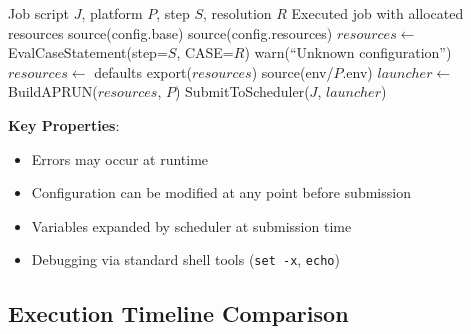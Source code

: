 \documentclass[11pt,twoside]{article}
\newcommand{\gw}{\textsc{Global-Workflow}}
\begin{document}
\begin{algorithm}[H]
\caption{\gw{} Configuration Resolution}
\label{alg:gw-exec}
\begin{algorithmic}[1]
\REQUIRE Job script $J$, platform $P$, step $S$, resolution $R$
\ENSURE Executed job with allocated resources
\STATE source(config.base) 
\STATE source(config.resources) 
\STATE $resources \gets$ EvalCaseStatement(step=$S$, CASE=$R$) 
    \STATE warn(``Unknown configuration'')
    \STATE $resources \gets$ defaults
\ENDIF {}
\STATE export($resources$) 
\STATE source(env/$P$.env) 
\STATE $launcher \gets$ BuildAPRUN($resources$, $P$)
\STATE SubmitToScheduler($J$, $launcher$) 
\end{algorithmic}
\end{algorithm}

\textbf{Key Properties}:
\begin{itemize}[leftmargin=2em,noitemsep,topsep=2pt]
    \item Errors may occur at runtime
    \item Configuration can be modified at any point before submission
    \item Variables expanded by scheduler at submission time
    \item Debugging via standard shell tools (\texttt{set -x}, \texttt{echo})
\end{itemize}

\subsection{Execution Timeline Comparison}
\end{document}
